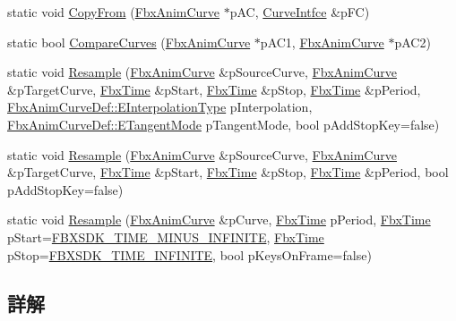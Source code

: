 \begin{DoxyCompactItemize}
\item 
static void \hyperlink{class_fbx_anim_utilities_accddd7a975ab0eb0f042903846a14704}{Copy\+From} (\hyperlink{class_fbx_anim_curve}{Fbx\+Anim\+Curve} $\ast$p\+AC, \hyperlink{class_fbx_anim_utilities_1_1_curve_intfce}{Curve\+Intfce} \&p\+FC)
\item 
static bool \hyperlink{class_fbx_anim_utilities_a613e164f8bfb96506a7ffb8e4a5747ae}{Compare\+Curves} (\hyperlink{class_fbx_anim_curve}{Fbx\+Anim\+Curve} $\ast$p\+A\+C1, \hyperlink{class_fbx_anim_curve}{Fbx\+Anim\+Curve} $\ast$p\+A\+C2)
\item 
static void \hyperlink{class_fbx_anim_utilities_ad9fce04e63f88c748c00a9451b4b099b}{Resample} (\hyperlink{class_fbx_anim_curve}{Fbx\+Anim\+Curve} \&p\+Source\+Curve, \hyperlink{class_fbx_anim_curve}{Fbx\+Anim\+Curve} \&p\+Target\+Curve, \hyperlink{class_fbx_time}{Fbx\+Time} \&p\+Start, \hyperlink{class_fbx_time}{Fbx\+Time} \&p\+Stop, \hyperlink{class_fbx_time}{Fbx\+Time} \&p\+Period, \hyperlink{class_fbx_anim_curve_def_add2ab7d10d856ab0868cc9b143d59ea5}{Fbx\+Anim\+Curve\+Def\+::\+E\+Interpolation\+Type} p\+Interpolation, \hyperlink{class_fbx_anim_curve_def_ac810ccc5ca0527704ab5175479964b87}{Fbx\+Anim\+Curve\+Def\+::\+E\+Tangent\+Mode} p\+Tangent\+Mode, bool p\+Add\+Stop\+Key=false)
\item 
static void \hyperlink{class_fbx_anim_utilities_a7ca36067a237e86124878d2000ddd9e5}{Resample} (\hyperlink{class_fbx_anim_curve}{Fbx\+Anim\+Curve} \&p\+Source\+Curve, \hyperlink{class_fbx_anim_curve}{Fbx\+Anim\+Curve} \&p\+Target\+Curve, \hyperlink{class_fbx_time}{Fbx\+Time} \&p\+Start, \hyperlink{class_fbx_time}{Fbx\+Time} \&p\+Stop, \hyperlink{class_fbx_time}{Fbx\+Time} \&p\+Period, bool p\+Add\+Stop\+Key=false)
\item 
static void \hyperlink{class_fbx_anim_utilities_a3fde586a335a5296a9c5a215993b8a52}{Resample} (\hyperlink{class_fbx_anim_curve}{Fbx\+Anim\+Curve} \&p\+Curve, \hyperlink{class_fbx_time}{Fbx\+Time} p\+Period, \hyperlink{class_fbx_time}{Fbx\+Time} p\+Start=\hyperlink{fbxtime_8h_ad274ec1f909723127ab573a52f8be216}{F\+B\+X\+S\+D\+K\+\_\+\+T\+I\+M\+E\+\_\+\+M\+I\+N\+U\+S\+\_\+\+I\+N\+F\+I\+N\+I\+TE}, \hyperlink{class_fbx_time}{Fbx\+Time} p\+Stop=\hyperlink{fbxtime_8h_a1e6db3fe0f84f0b7daa775739f93526f}{F\+B\+X\+S\+D\+K\+\_\+\+T\+I\+M\+E\+\_\+\+I\+N\+F\+I\+N\+I\+TE}, bool p\+Keys\+On\+Frame=false)
\end{DoxyCompactItemize}


\subsection{詳解}


